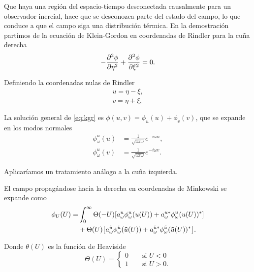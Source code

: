 Que haya una región del espacio-tiempo desconectada causalmente para un observador inercial,
hace que se desconozca parte del estado del campo, lo que conduce a que el campo siga una 
distribución térmica.
En la demostración partimos de la ecuación de Klein-Gordon en coordenadas de Rindler
para la cuña derecha
\begin{equation}
  -\pdv[2]{\phi}{\eta}+\pdv[2]{\phi}{\xi} = 0.
  \label{eq:kgr}
\end{equation}

Definiendo la coordenadas nulas de Rindler 
\begin{equation}
  \begin{gathered}
  u=\eta-\xi,\\
  v=\eta+\xi, 
  \end{gathered}
\end{equation}

La solución general de \ref{eq:kgr} es $\phi(u,v)=\phi_u(u)+\phi_v(v)$, que se expande en los
modos normales
\begin{equation}
  \begin{aligned}
    \phi^u_\omega(u) &=\frac{1}{\sqrt{4\pi\omega}}e^{-i\omega u},\\
    \phi^u_\omega(v) &=\frac{1}{\sqrt{4\pi\omega}}e^{-i\omega v}.
  \end{aligned}
\end{equation}

Aplicaríamos un tratamiento análogo a la cuña izquierda.

El campo propagándose hacia la derecha en coordenadas de Minkowski se expande como
\begin{equation}
  \begin{aligned}
    \phi_U(U)=&\int_0^\infty \Theta(-U)\qty[a^u_\omega \phi^u_\omega(u(U))+a_\omega^{u*}\phi_\omega^u(u(U))^*] \\
    &+\Theta(U)\qty[a^{\tilde u}_\omega \phi^{\tilde u}_\omega(\tilde u(U))+a_\omega^{\tilde u*}\phi_\omega^{\tilde u}(\tilde u(U))^*].
  \end{aligned}
\end{equation}

Donde $\theta(U)$ es la función de Heaviside 
\begin{equation}
   \Theta(U)=
  \begin{cases}
    0\qquad \text{si }U<0 \\
    1\qquad \text{si }U>0
    .
  \end{cases}
\end{equation}

